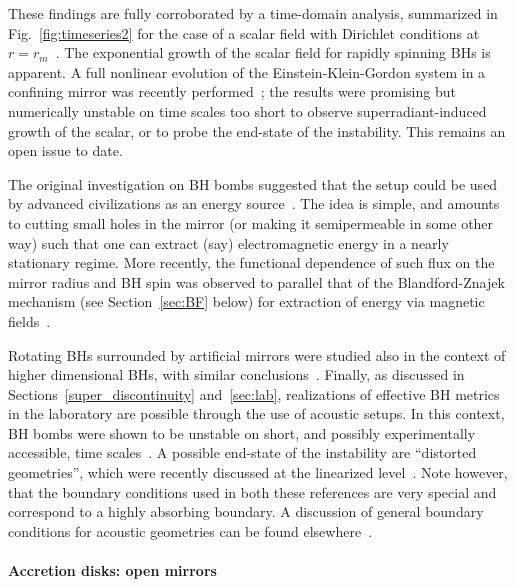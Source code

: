 \documentclass[11pt]{article}
\numberwithin{equation}{section} %
\begin{document}
These findings are fully corroborated by a time-domain analysis, summarized in Fig.~\ref{fig:timeseries2} for the case of a scalar field with
Dirichlet conditions at $r=r_m$~\cite{Dolan:2012yt}. The exponential growth of the scalar field for rapidly spinning BHs is apparent.
A full nonlinear evolution of the Einstein-Klein-Gordon system in a confining mirror was recently performed~\cite{Witek:2010qc}; the results were promising but numerically unstable on time scales too short to observe superradiant-induced growth of the scalar, or to probe the end-state of the instability. This remains an open issue to date.


The original investigation on BH bombs suggested that the setup could be used by advanced civilizations as an energy source~\cite{Press:1972zz}.
The idea is simple, and amounts to cutting small holes in the mirror (or making it semipermeable in some other way) such that one can extract (say) electromagnetic energy in a nearly stationary regime.
More recently, the functional dependence of such flux on the mirror radius and BH spin was observed to parallel that of the Blandford-Znajek mechanism (see Section~\ref{sec:BF} below) for extraction of energy via magnetic fields~\cite{Wilson-Gerow:2015esa}.



Rotating BHs surrounded by artificial mirrors were studied also in the context of higher dimensional BHs, with similar conclusions~\cite{Lee:2011ez,Aliev:2014aba}. Finally, as discussed in Sections~\ref{super_discontinuity} and~\ref{sec:lab}, realizations of effective BH metrics in the laboratory are possible through the use of acoustic setups. In this context, BH bombs were shown to be unstable on short, and possibly experimentally accessible, time scales~\cite{Berti:2004ju}. A possible end-state of the instability are ``distorted geometries'', which were recently discussed at the linearized level~\cite{Benone:2014nla}. Note however, that the boundary conditions used in both these references are very special and correspond to a highly absorbing boundary.
A discussion of general boundary conditions for acoustic geometries can be found elsewhere~\cite{Oliveira:2014oja}.

\paragraph{Accretion disks: open mirrors}
\end{document}
